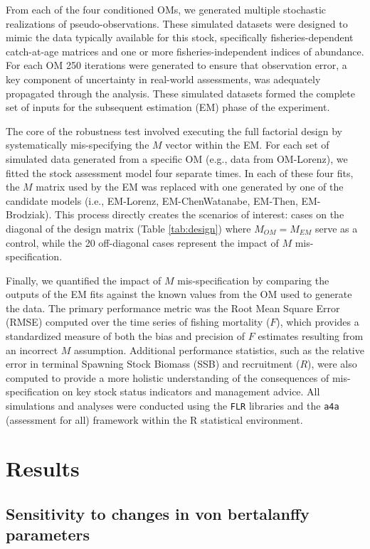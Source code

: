 \documentclass{article}
\begin{document}
From each of the four conditioned OMs, we generated multiple stochastic realizations of pseudo-observations. These simulated datasets were designed to mimic the data typically available for this stock, specifically fisheries-dependent catch-at-age matrices and one or more fisheries-independent indices of abundance. For each OM 250 iterations were generated to ensure that observation error, a key component of uncertainty in real-world assessments, was adequately propagated through the analysis. These simulated datasets formed the complete set of inputs for the subsequent estimation (EM) phase of the experiment.

The core of the robustness test involved executing the full factorial design by systematically mis-specifying the $M$ vector within the EM. For each set of simulated data generated from a specific OM (e.g., data from OM-Lorenz), we fitted the stock assessment model four separate times. In each of these four fits, the $M$ matrix used by the EM was replaced with one generated by one of the candidate models (i.e., EM-Lorenz, EM-ChenWatanabe, EM-Then, EM-Brodziak). This process directly creates the scenarios of interest: cases on the diagonal of the design matrix (Table \ref{tab:design}) where $M_{OM} = M_{EM}$ serve as a control, while the 20 off-diagonal cases represent the impact of $M$ mis-specification.

Finally, we quantified the impact of $M$ mis-specification by comparing the outputs of the EM fits against the known values from the OM used to generate the data. The primary performance metric was the Root Mean Square Error (RMSE) computed over the time series of fishing mortality ($F$), which provides a standardized measure of both the bias and precision of $F$ estimates resulting from an incorrect $M$ assumption. Additional performance statistics, such as the relative error in terminal Spawning Stock Biomass (SSB) and recruitment ($R$), were also computed to provide a more holistic understanding of the consequences of mis-specification on key stock status indicators and management advice. All simulations and analyses were conducted using the \texttt{FLR} libraries and the \texttt{a4a} (assessment for all) framework within the R statistical environment.

\section{Results}

\subsection{Sensitivity to changes in von bertalanffy parameters}
\end{document}
